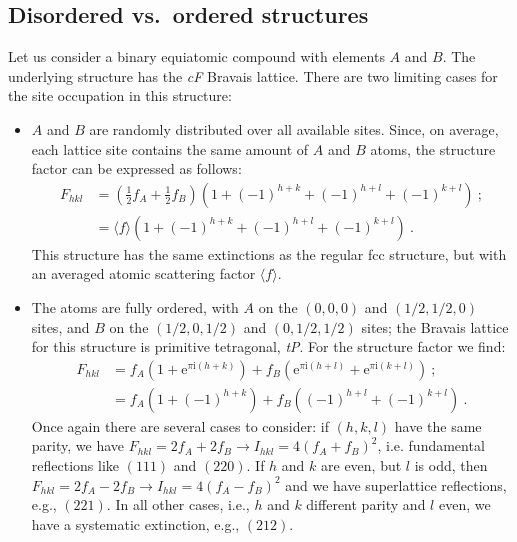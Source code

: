 \subsection{Disordered vs.\ ordered structures}\label{\chabbr:ssec:SFordering}
Let us consider a binary equiatomic compound with elements $A$ and $B$. The underlying structure has the \textit{cF} Bravais lattice.  There are two limiting cases for the site occupation in this structure:
\begin{itemize}
	\item $A$ and $B$ are randomly distributed over all available sites.  Since, on average, each lattice site contains the same amount of $A$ and $B$ atoms, the structure factor can be expressed as follows:
	\begin{equation*}
	\begin{split}
	F_{hkl}&=\left(\frac{1}{2}f_A+\frac{1}{2}f_B\right)\left(1+(-1)^{h+k}+(-1)^{h+l}+(-1)^{k+l}\right)\ ;\\
	&=\langle f\rangle \left(1+(-1)^{h+k}+(-1)^{h+l}+(-1)^{k+l}\right)\ .
	\end{split}
	\end{equation*}
	This structure has the same extinctions as the regular fcc structure, but with an averaged atomic scattering factor $\langle f\rangle$.
	\item The atoms are fully ordered, with $A$ on the $(0,0,0)$ and $(1/2,1/2,0)$ sites, and $B$ on the $(1/2,0,1/2)$ and $(0,1/2,1/2)$ sites; the Bravais lattice for this structure is primitive tetragonal, \textit{tP}.  For the structure factor we find:
	\begin{equation*}
	\begin{split}
	F_{hkl}&= f_A (1+\mathrm{e}^{\pi\mathrm{i}(h+k)})+f_B(\mathrm{e}^{\pi\mathrm{i}(h+l)}+\mathrm{e}^{\pi\mathrm{i}(k+l)})\ ;\\
	&=f_A(1+(-1)^{h+k})+f_B((-1)^{h+l}+(-1)^{k+l})\ .
	\end{split}
	\end{equation*}
	Once again there are several cases to consider: if $(h,k,l)$ have the same parity, we have $F_{hkl} = 2f_A+2f_B\rightarrow I_{hkl}=4(f_A+f_B)^2$, i.e. fundamental reflections like $(111)$ and $(220)$.  If $h$ and $k$ are even, but $l$ is odd, then $F_{hkl} = 2f_A-2f_B\rightarrow I_{hkl}=4(f_A-f_B)^2$ and we have superlattice reflections, e.g., $(221)$.  In all other cases, i.e., $h$ and $k$ different parity and $l$ even, we have a systematic extinction, e.g., $(212)$.\\ 
\end{itemize}

